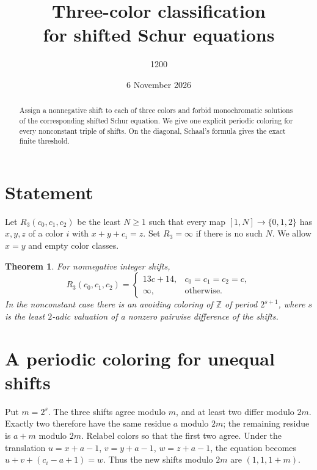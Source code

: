 \documentclass[11pt]{article}
\title{\textbf{Three-color classification\\for shifted Schur equations}}
\author{1200}
\date{6 November 2026}
\newtheorem{theorem}{Theorem}
\begin{document}
\maketitle
\begin{abstract}
Assign a nonnegative shift to each of three colors and forbid monochromatic
solutions of the corresponding shifted Schur equation. We give one explicit
periodic coloring for every nonconstant triple of shifts. On the diagonal,
Schaal's formula gives the exact finite threshold.
\end{abstract}

\section{Statement}
Let $R_3(c_0,c_1,c_2)$ be the least $N\geq1$ such that every map
$[1,N]\to\{0,1,2\}$ has $x,y,z$ of a color $i$ with $x+y+c_i=z$.
Set $R_3=\infty$ if there is no such $N$. We allow $x=y$ and empty color classes.

\begin{theorem}
For nonnegative integer shifts,
\[
 R_3(c_0,c_1,c_2)=
 \begin{cases}
  13c+14,& c_0=c_1=c_2=c,\\
  \infty,& \text{otherwise}.
 \end{cases}
\]
In the nonconstant case there is an avoiding coloring of $\mathbb Z$ of period
$2^{s+1}$, where $s$ is the least $2$-adic valuation of a nonzero pairwise
difference of the shifts.
\end{theorem}

\section{A periodic coloring for unequal shifts}
Put $m=2^s$. The three shifts agree modulo $m$, and at least two differ
modulo $2m$. Exactly two therefore have the same residue $a$ modulo $2m$;
the remaining residue is $a+m$ modulo $2m$. Relabel colors so that the
first two agree. Under the translation $u=x+a-1$, $v=y+a-1$, $w=z+a-1$,
the equation becomes $u+v+(c_i-a+1)=w$. Thus the new shifts modulo $2m$
are $(1,1,1+m)$.
\end{document}

